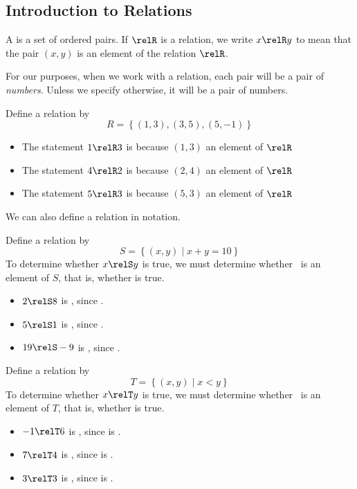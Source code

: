 \subsection{Introduction to Relations} 
\begin{definition}[Relation]
A  is a set of ordered pairs. If $\relR$ is a relation, we write $x\relR y$ to mean that the pair $(x,y)$ is an element of the relation $\relR$.
\end{definition}
For our purposes, when we work with a relation, each pair will be a pair of \emph{numbers}. Unless we specify otherwise, it will be a pair of \makeblank[1in] numbers.
\begin{Example}
Define a relation by
\[
R=\left\{(1,3),(3,5),(5,-1)\right\}
\]
\begin{itemize}
\item The statement $1\relR 3$ is \makeblank[1in] because $(1,3)$ \makeblank[1in] an element of $\relR$
\item The statement $4\relR 2$ is \makeblank[1in] because $(2,4)$ \makeblank[1in] an element of $\relR$
\item The statement $5\relR 3$ is \makeblank[1in] because $(5,3)$ \makeblank[1in] an element of $\relR$
\end{itemize}
\end{Example}
We can also define a relation in \makeblank notation.
\begin{Example}
Define a relation by
\[
S=\left\{(x,y)\mid x+y=10\right\}
\]
To determine whether $x\relS y$ is true, we must determine whether \blankpair\ is an element of $S$, that is, whether \makeblank[1in] is true.
\begin{itemize}
\item $2\relS 8$ is \makeblank[1in], since \makeblank[1.5in].
\item $5\relS 1$ is \makeblank[1in], since \makeblank[1.5in].
\item $19\relS -9$ is \makeblank[1in], since \makeblank[1.5in].
\end{itemize}
\end{Example}
\begin{Example}
Define a relation by
\[
T=\left\{(x,y)\mid x<y\right\}
\]
To determine whether $x\relT y$ is true, we must determine whether \blankpair\ is an element of $T$, that is, whether \makeblank[1in] is true.
\begin{itemize}
\item $-1\relT 6$ is \makeblank[1in], since \makeblank[1in] is \makeblank[1in].
\item $7\relT 4$ is \makeblank[1in], since \makeblank[1in] is \makeblank[1in].
\item $3\relT 3$ is \makeblank[1in], since \makeblank[1in] is \makeblank[1in].
\end{itemize}
\end{Example}